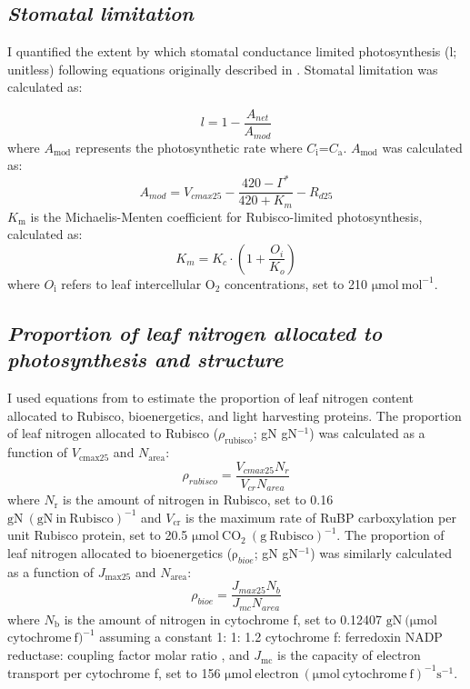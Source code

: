 \subsection{\textit{Stomatal limitation}}
\noindent I quantified the extent by which stomatal conductance limited photosynthesis (l; unitless) following equations originally described in . Stomatal limitation was calculated as:

\begin{equation} \label{eq_5.3}
    l = 1 - \frac{A_{net}}{A_{mod}}
\end{equation}
\noindent where $A_\mathrm{mod}$ represents the photosynthetic rate where $C_\mathrm{i}$=$C_\mathrm{a}$. $A_\mathrm{mod}$ was calculated as:
\begin{equation} \label{eq_5.4}
    A_{mod} = V_{cmax25} - \frac{420 - \Gamma^*}{420 + K_{m}} - R_{d25}
\end{equation}
\noindent $K_\mathrm{m}$ is the Michaelis-Menten coefficient for Rubisco-limited photosynthesis, calculated as:
\begin{equation} \label{eq_5.5}
    K_{m} = K_{c} \cdot \left ( 1 + \frac{O_i}{K_o} \right )
\end{equation}
\noindent where $O_\mathrm{i}$ refers to leaf intercellular O$_2$ concentrations, set to 210 $\mathrm{\mu mol\ mol^{-1}}$.

\subsection{\textit{Proportion of leaf nitrogen allocated to photosynthesis and structure}}
\noindent I used equations from  to estimate the proportion of leaf nitrogen content allocated to Rubisco, bioenergetics, and light harvesting proteins. The proportion of leaf nitrogen allocated to Rubisco ($\rho_\mathrm{rubisco}$; gN gN$^{-1}$) was calculated as a function of $V_\mathrm{cmax25}$ and $N_\mathrm{area}$: 
\begin{equation} \label{eqn_5.6}
    \rho_{rubisco}=\frac{V_{cmax25}N_r}{V_{cr}N_{area}}
\end{equation}
\noindent where $N_\mathrm{r}$ is the amount of nitrogen in Rubisco, set to 0.16 $\mathrm{gN\ (gN\ in\ Rubisco)^{-1}}$ and $V_\mathrm{cr}$ is the maximum rate of RuBP carboxylation per unit Rubisco protein, set to 20.5 $\mathrm{\mu mol\ CO_2\ (g\ Rubisco)^{-1}}$. The proportion of leaf nitrogen allocated to bioenergetics ($\mathrm\rho_{bioe}$; gN gN$^{-1}$) was similarly calculated as a function of $J_\mathrm{max25}$ and $N_\mathrm{area}$:
\begin{equation} \label{eqn_5.7}
    \rho_{bioe}=\frac{J_{max25}N_b}{J_{mc}N_{area}}
\end{equation}
\noindent where $N_\mathrm{b}$ is the amount of nitrogen in cytochrome f, set to 0.12407 $\mathrm{gN\ (\mu mol}$ $\mathrm{cytochrome\ f)^{-1}}$ assuming a constant 1: 1: 1.2 cytochrome f: ferredoxin NADP reductase: coupling factor molar ratio , and $J_\mathrm{mc}$ is the capacity of electron transport per cytochrome f, set to 156 $\mathrm{\mu mol\ electron\ (\mu mol\ cytochrome\ f)^{-1} s^{-1}}$.

